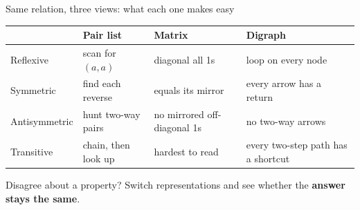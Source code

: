\documentclass[aspectratio=169,10pt]{beamer}
\begin{document}
\begin{frame}{Same relation, three views: what each one makes easy}
\begin{center}
\begin{tabular}{lp{3.3cm}p{3.3cm}p{3.3cm}}
 & \textbf{Pair list} & \textbf{Matrix} & \textbf{Digraph} \\\hline
Reflexive & scan for $(a,a)$ & diagonal all 1s & loop on every node \\[3pt]
Symmetric & find each reverse & equals its mirror & every arrow has a return \\[3pt]
Antisymmetric & hunt two-way pairs & no mirrored off-diagonal 1s & no two-way arrows \\[3pt]
Transitive & chain, then look up & hardest to read & every two-step path has a shortcut \\
\end{tabular}
\end{center}
\vspace{4pt}
Disagree about a property? Switch representations and see whether the \textbf{answer stays the same}.
\end{frame}
\end{document}
